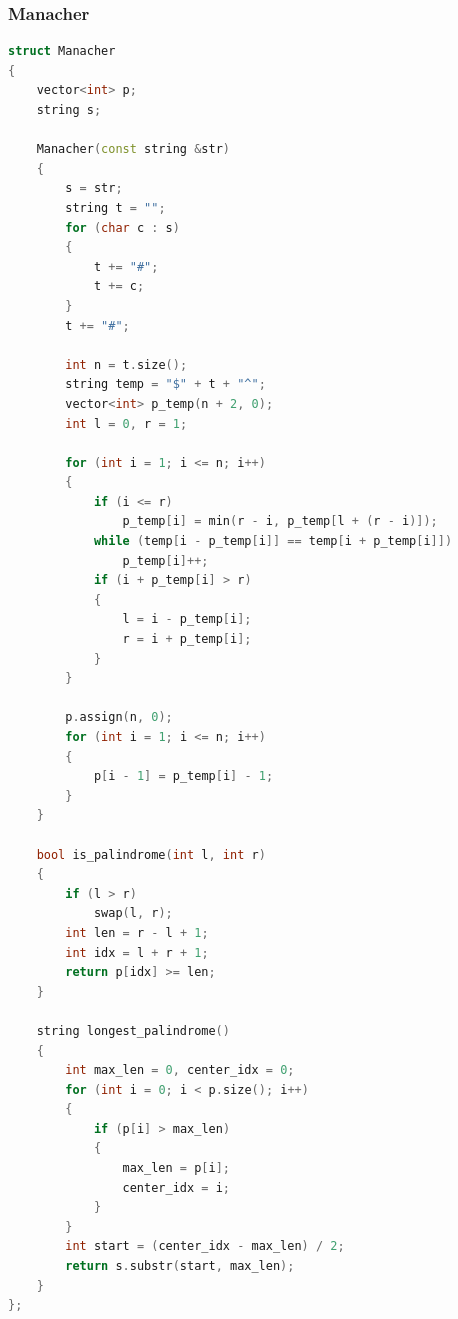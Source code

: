 \documentclass[10pt,landscape,a4paper,twocolumn]{article}
\begin{document}
\subsubsection{Manacher}
\begin{lstlisting}[language=C++]
struct Manacher
{
    vector<int> p;
    string s;

    Manacher(const string &str)
    {
        s = str;
        string t = "";
        for (char c : s)
        {
            t += "#";
            t += c;
        }
        t += "#";

        int n = t.size();
        string temp = "$" + t + "^";
        vector<int> p_temp(n + 2, 0);
        int l = 0, r = 1;

        for (int i = 1; i <= n; i++)
        {
            if (i <= r)
                p_temp[i] = min(r - i, p_temp[l + (r - i)]);
            while (temp[i - p_temp[i]] == temp[i + p_temp[i]])
                p_temp[i]++;
            if (i + p_temp[i] > r)
            {
                l = i - p_temp[i];
                r = i + p_temp[i];
            }
        }

        p.assign(n, 0);
        for (int i = 1; i <= n; i++)
        {
            p[i - 1] = p_temp[i] - 1;
        }
    }

    bool is_palindrome(int l, int r)
    {
        if (l > r)
            swap(l, r);
        int len = r - l + 1;
        int idx = l + r + 1;
        return p[idx] >= len;
    }

    string longest_palindrome()
    {
        int max_len = 0, center_idx = 0;
        for (int i = 0; i < p.size(); i++)
        {
            if (p[i] > max_len)
            {
                max_len = p[i];
                center_idx = i;
            }
        }
        int start = (center_idx - max_len) / 2;
        return s.substr(start, max_len);
    }
};

\end{lstlisting}
\end{document}
